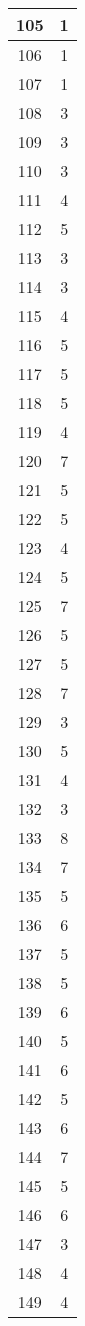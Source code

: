 \documentclass[letterpaper, 12pt]{article}
\begin{document}
\begin{longtable}{|c|c|}
\hline
105 & 1 \\
\hline
106 & 1 \\
\hline
107 & 1 \\
\hline
108 & 3 \\
\hline
109 & 3 \\
\hline
110 & 3 \\
\hline
111 & 4 \\
\hline
112 & 5 \\
\hline
113 & 3 \\
\hline
114 & 3 \\
\hline
115 & 4 \\
\hline
116 & 5 \\
\hline
117 & 5 \\
\hline
118 & 5 \\
\hline
119 & 4 \\
\hline
120 & 7 \\
\hline
121 & 5 \\
\hline
122 & 5 \\
\hline
123 & 4 \\
\hline
124 & 5 \\
\hline
125 & 7 \\
\hline
126 & 5 \\
\hline
127 & 5 \\
\hline
128 & 7 \\
\hline
129 & 3 \\
\hline
130 & 5 \\
\hline
131 & 4 \\
\hline
132 & 3 \\
\hline
133 & 8 \\
\hline
134 & 7 \\
\hline
135 & 5 \\
\hline
136 & 6 \\
\hline
137 & 5 \\
\hline
138 & 5 \\
\hline
139 & 6 \\
\hline
140 & 5 \\
\hline
141 & 6 \\
\hline
142 & 5 \\
\hline
143 & 6 \\
\hline
144 & 7 \\
\hline
145 & 5 \\
\hline
146 & 6 \\
\hline
147 & 3 \\
\hline
148 & 4 \\
\hline
149 & 4 \\

\end{longtable}
\end{document}
